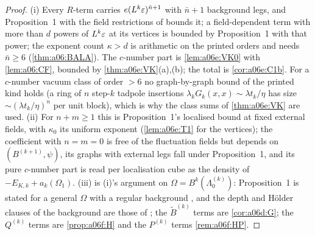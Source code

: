 \begin{proof}
(i) Every $R$-term carries $e(L^k\varepsilon)^{\bar n+1}$ with $\bar n+1$ background legs, and Proposition~1 with the field restrictions of \cite[Sect.~3]{Ba1} bounds it; a field-dependent term with more than $d$ powers of $L^k\varepsilon$ at its vertices is bounded by Proposition~1 with that power; the exponent count $\kappa>d$ is arithmetic on the printed orders and needs $\bar n\ge6$ (\cref{thm:a06:BALA}). The $c$-number part is \cref{lem:a06e:VK0} with \cref{lem:a06:CF}, bounded by \cref{thm:a06e:VK}(a),(b); the total is \cref{cor:a06e:C1b}. For a $c$-number vacuum class of order $>6$ no graph-by-graph bound of the printed kind holds (a ring of $n$ step-$k$ tadpole insertions $\lambda_kG_k(x,x)\sim\lambda t_k/\eta$ has size $\sim(\lambda t_k/\eta)^n$ per unit block), which is why the class sums of \cref{thm:a06e:VK} are used. (ii) For $n+m\ge1$ this is Proposition~1's localised bound at fixed external fields, with $\kappa_0$ its uniform exponent (\cref{lem:a06e:T1} for the \cite[(1.7)]{Ba3} vertices); the coefficient with $n=m=0$ is free of the fluctuation fields but depends on $(B^{(k+1)},\psi)$, its graphs with external legs fall under Proposition~1, and its pure $c$-number part is read per localisation cube as the density of $-E_{K,k}+a_k(\Omega_1)$. (iii) is (i)'s argument on $\Omega=B^k(\Lambda^{(k)}_0)$: Proposition~1 is stated for a general $\Omega$ with a regular background \cite[p.~412]{Ba3}, and the depth and H\"older clauses of the background are those of \cite[(2.94)--(2.98)]{Ba2}; the $\tilde B^{(k)}$ terms are \cref{cor:a06d:G}; the $Q^{(k)}$ terms are \cref{prop:a06f:H} and the $P^{(k)}$ terms \cref{rem:a06f:HP}.
\end{proof}
